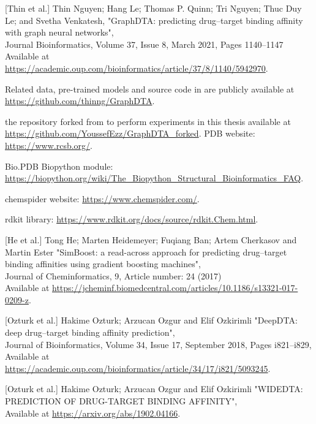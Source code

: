\documentclass[11pt, a4paper]{article}
\begin{document}
\begin{thebibliography}{3}

    [Thin et al.] Thin Nguyen;  Hang Le; Thomas P. Quinn; Tri Nguyen; Thuc Duy Le; and
    Svetha Venkatesh, "GraphDTA: predicting drug–target binding affinity with
    graph neural networks",
    \\Journal Bioinformatics, Volume 37, Issue 8, March 2021, Pages 1140–1147
    \\Available at
    \url{https://academic.oup.com/bioinformatics/article/37/8/1140/5942970}.

    Related data, pre-trained models and source code in \cite{1} are publicly available at \url{https://github.com/thinng/GraphDTA}.

    the repository forked from \cite{2} to perform experiments in this thesis available at \url{https://github.com/YoussefEzz/GraphDTA_forked}.
PDB website: \url{https://www.rcsb.org/}.

Bio.PDB Biopython module: \url{https://biopython.org/wiki/The_Biopython_Structural_Bioinformatics_FAQ}.

chemspider website: \url{https://www.chemspider.com/}.

rdkit library: \url{https://www.rdkit.org/docs/source/rdkit.Chem.html}.

[He et al.] Tong He; Marten Heidemeyer; Fuqiang Ban; Artem Cherkasov and Martin Ester "SimBoost: a read-across approach
for predicting drug–target binding affinities using gradient boosting machines",
    \\Journal of Cheminformatics, 9, Article number: 24 (2017)
    \\Available at
    \url{https://jcheminf.biomedcentral.com/articles/10.1186/s13321-017-0209-z}.

[Ozturk et al.] Hakime Ozturk; Arzucan Ozgur and Elif Ozkirimli "DeepDTA: deep drug–target binding
affinity prediction",
    \\Journal of Bioinformatics, Volume 34, Issue 17, September 2018, Pages i821–i829,
    \\Available at
    \url{https://academic.oup.com/bioinformatics/article/34/17/i821/5093245}.

[Ozturk et al.] Hakime Ozturk; Arzucan Ozgur and Elif Ozkirimli "WIDEDTA: PREDICTION OF DRUG-TARGET BINDING AFFINITY",
    \\Available at
    \url{https://arxiv.org/abs/1902.04166}.


\end{thebibliography}
\end{document}
